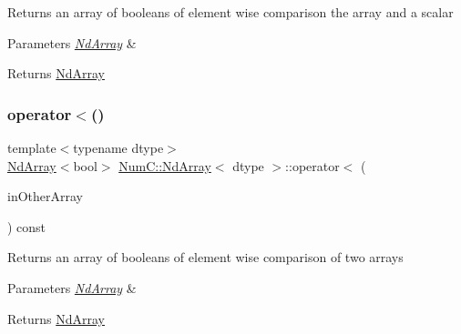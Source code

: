 Returns an array of booleans of element wise comparison the array and a scalar


\begin{DoxyParams}{Parameters}
{\em \mbox{\hyperlink{class_num_c_1_1_nd_array}{Nd\+Array}}} & \\
\hline
\end{DoxyParams}
\begin{DoxyReturn}{Returns}
\mbox{\hyperlink{class_num_c_1_1_nd_array}{Nd\+Array}} 
\end{DoxyReturn}
\mbox{\label{class_num_c_1_1_nd_array_a206b5abfcdd532efadeec123979dcb08}} 
\subsubsection{\texorpdfstring{operator$<$()}{operator<()}\hspace{0.1cm}{\footnotesize\ttfamily [2/2]}}
{\footnotesize\ttfamily template$<$typename dtype$>$ \\
\mbox{\hyperlink{class_num_c_1_1_nd_array}{Nd\+Array}}$<$bool$>$ \mbox{\hyperlink{class_num_c_1_1_nd_array}{Num\+C\+::\+Nd\+Array}}$<$ dtype $>$\+::operator$<$ (\begin{DoxyParamCaption}\item[{const \mbox{\hyperlink{class_num_c_1_1_nd_array}{Nd\+Array}}$<$ dtype $>$ \&}]{in\+Other\+Array }\end{DoxyParamCaption}) const\hspace{0.3cm}{\ttfamily [inline]}}

Returns an array of booleans of element wise comparison of two arrays


\begin{DoxyParams}{Parameters}
{\em \mbox{\hyperlink{class_num_c_1_1_nd_array}{Nd\+Array}}} & \\
\hline
\end{DoxyParams}
\begin{DoxyReturn}{Returns}
\mbox{\hyperlink{class_num_c_1_1_nd_array}{Nd\+Array}} 
\end{DoxyReturn}
\mbox{\label{class_num_c_1_1_nd_array_a6ca5d2e5f0365adf35747b26fd4a892f}} 
